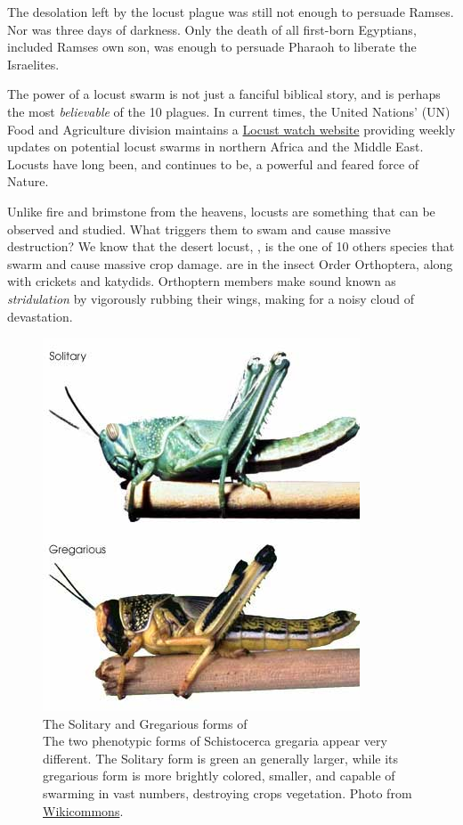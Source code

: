 The desolation left by the locust plague was still not enough to persuade Ramses. Nor was three days of darkness. Only the death of all first-born Egyptians, included Ramses own son, was enough to persuade Pharaoh to liberate the Israelites.

The power of a locust swarm is not just a fanciful biblical story, and is perhaps the most \textit{believable} of the 10 plagues. In current times, the United Nations' (UN) Food and Agriculture division maintains a \href{http://www.fao.org/ag/locusts/en/info/info/news/index.html}{Locust watch website} providing weekly updates on potential locust swarms in northern Africa and the Middle East. Locusts have long been, and continues to be, a powerful and feared force of Nature.

Unlike fire and brimstone from the heavens, locusts are something that can be observed and studied. What triggers them to swam and cause massive destruction? We know that the desert locust, \locusts{}, is the one of 10 others species that swarm and cause massive crop damage. \locusts{} are in the insect Order Orthoptera, along with crickets and katydids. Orthoptern members make sound known as \textit{stridulation} by vigorously rubbing their wings, making for a noisy cloud of devastation.


\begin{figure}[htbp]
	\centering 
	\includegraphics{Figures/Chapter1/DesertLocust.jpeg}
	\caption[The Solitary and Gregarious forms of \locusts{}]
	{
		The Solitary and Gregarious forms of \locusts{}\\[0.25cm]
		The two phenotypic forms of Schistocerca gregaria appear very different.  The Solitary form is green an generally larger, while its gregarious form is more brightly colored, smaller, and capable of swarming in vast numbers, destroying crops vegetation. Photo from \href{http://www.wikicommons.com}{Wikicommons}.
	}
	\label{fig:Locust}
\end{figure}

